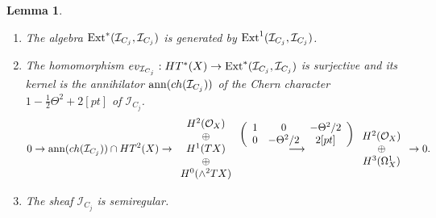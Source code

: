 \documentclass[12pt]{amsart}
\numberwithin{equation}{subsection}
\theoremstyle{plain}
\newtheorem{lem}[thm]{Lemma}
\theoremstyle{definition}
\newcommand{\ann}{{\rm ann}}
\newcommand{\LongRightArrowOf}[1]{\stackrel{#1}{\longrightarrow}}
\newcommand{\StructureSheaf}[1]{{\mathcal O}_{#1}}
\newcommand{\Ext}{{\rm Ext}}
\newcommand{\Ideal}[1]{{\mathcal I}_{#1}}
\begin{document}
\begin{lem}
\label{lemma-Ext-algebra-generated-by-Ext-1-when-n=1}
\begin{enumerate}
\item
\label{lemma-item-Ext-algebra-generated-by-Ext-1-when-n=1}
The algebra $\Ext^*(\Ideal{C_j},\Ideal{C_j})$ is generated by $\Ext^1(\Ideal{C_j},\Ideal{C_j})$.
\item
\label{lemma-item-Yoneda-algebra-is-quotient-of-Hochschild}
The homomorphism $ev_{\Ideal{C_j}}:HT^*(X)\rightarrow \Ext^*(\Ideal{C_j},\Ideal{C_j})$ is surjective and its kernel is the annihilator $\ann(ch(\Ideal{C_j}))$ of the Chern character $1-\frac{1}{2}\Theta^2+2[pt]$ of $\Ideal{C_j}$.
\[
0\rightarrow \ann(ch(\Ideal{C_j}))\cap HT^2(X)\rightarrow 
\begin{array}{c}
H^2(\StructureSheaf{X})\\
\oplus\\
H^1(TX)\\
\oplus\\
H^0(\wedge^2TX)
\end{array}
\LongRightArrowOf{\left(
\begin{array}{ccc}
1&0&-\Theta^2/2
\\
0 & -\Theta^2/2&2[pt]
\end{array}
\right)}
\begin{array}{c}
H^2(\StructureSheaf{X}) \\ \oplus \\ H^3(\Omega^1_X)
\end{array}
\rightarrow 0.
\]
\item
\label{lemma-item-semiregular}
The sheaf $\Ideal{C_j}$ is semiregular.
\end{enumerate}
\end{lem}
\end{document}
